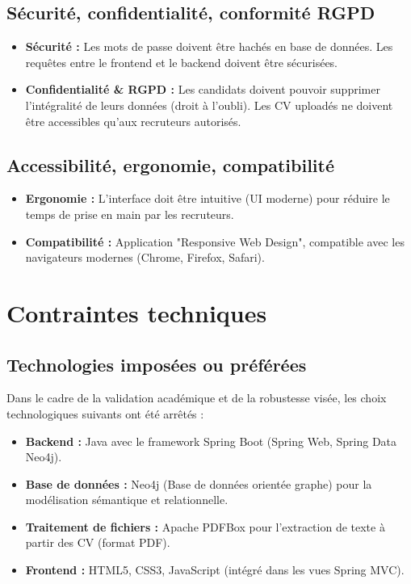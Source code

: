 \documentclass[12pt,a4paper]{report}
\begin{document}
\subsection{Sécurité, confidentialité, conformité RGPD}
\begin{itemize}
    \item \textbf{Sécurité :} Les mots de passe doivent être hachés en base de données. Les requêtes entre le frontend et le backend doivent être sécurisées.
    \item \textbf{Confidentialité \& RGPD :} Les candidats doivent pouvoir supprimer l'intégralité de leurs données (droit à l'oubli). Les CV uploadés ne doivent être accessibles qu'aux recruteurs autorisés.
\end{itemize}

\subsection{Accessibilité, ergonomie, compatibilité}
\begin{itemize}
    \item \textbf{Ergonomie :} L'interface doit être intuitive (UI moderne) pour réduire le temps de prise en main par les recruteurs.
    \item \textbf{Compatibilité :} Application "Responsive Web Design", compatible avec les navigateurs modernes (Chrome, Firefox, Safari).
\end{itemize}

\section{Contraintes techniques}

\subsection{Technologies imposées ou préférées}
Dans le cadre de la validation académique et de la robustesse visée, les choix technologiques suivants ont été arrêtés :
\begin{itemize}
    \item \textbf{Backend :} Java avec le framework Spring Boot (Spring Web, Spring Data Neo4j).
    \item \textbf{Base de données :} Neo4j (Base de données orientée graphe) pour la modélisation sémantique et relationnelle.
    \item \textbf{Traitement de fichiers :} Apache PDFBox pour l'extraction de texte à partir des CV (format PDF).
    \item \textbf{Frontend :} HTML5, CSS3, JavaScript (intégré dans les vues Spring MVC).
\end{itemize}
\end{document}
